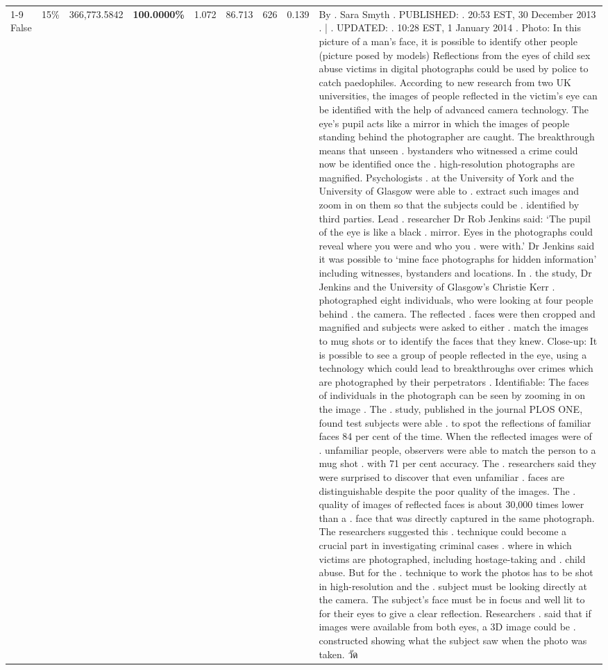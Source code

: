 \begin{table}[H]
\begin{tabular}{lllrlllll}
\cline{1-9} \cline{2-9}
False & 15\% & 366,773.5842 & \bfseries \color{red} 100.0000\% & 1.072 & 86.713 & 626 & 0.139 & By . Sara Smyth . PUBLISHED: . 20:53 EST, 30 December 2013 . | . UPDATED: . 10:28 EST, 1 January 2014 . Photo: In this picture of a man's face, it is possible to identify other people (picture posed by models) Reflections from the eyes of child sex abuse victims in digital photographs could be used by police to catch paedophiles. According to new research from two UK universities, the images of people reflected in the victim's eye can be identified with the help of advanced camera technology. The eye's pupil acts like a mirror in which the images of people standing behind the photographer are caught. The breakthrough means that unseen . bystanders who witnessed a crime could now be identified once the . high-resolution photographs are magnified. Psychologists . at the University of York and the University of Glasgow were able to . extract such images and zoom in on them so that the subjects could be . identified by third parties. Lead . researcher Dr Rob Jenkins said: ‘The pupil of the eye is like a black . mirror. Eyes in the photographs could reveal where you were and who you . were with.' Dr Jenkins said it was possible to ‘mine face photographs for hidden information' including witnesses, bystanders and locations. In . the study, Dr Jenkins and the University of Glasgow's Christie Kerr . photographed eight individuals, who were looking at four people behind . the camera. The reflected . faces were then cropped and magnified and subjects were asked to either . match the images to mug shots or to identify the faces that they knew. Close-up: It is possible to see a group of people reflected in the eye, using a technology which could lead to breakthroughs over crimes which are photographed by their perpetrators . Identifiable: The faces of individuals in the photograph can be seen by zooming in on the image . The . study, published in the journal PLOS ONE, found test subjects were able . to spot the reflections of familiar faces 84 per cent of the time. When the reflected images were of . unfamiliar people, observers were able to match the person to a mug shot . with 71 per cent accuracy. The . researchers said they were surprised to discover that even unfamiliar . faces are distinguishable despite the poor quality of the images. The . quality of images of reflected faces is about 30,000 times lower than a . face that was directly captured in the same photograph. The researchers suggested this . technique could become a crucial part in investigating criminal cases . where in which victims are photographed, including hostage-taking and . child abuse. But for the . technique to work the photos has to be shot in high-resolution and the . subject must be looking directly at the camera. The subject's face must be in focus and well lit to for their eyes to give a clear reflection. Researchers . said that if images were available from both eyes, a 3D image could be . constructed showing what the subject saw when the photo was taken. วัด \\

\end{tabular}
\end{table}
